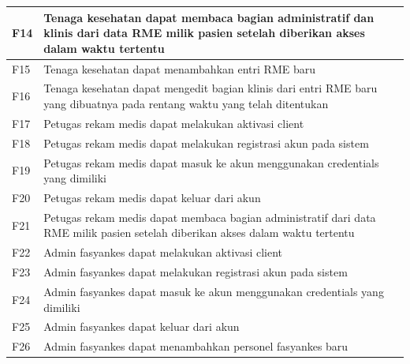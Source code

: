 \begin{longtable}{|p{0.8cm}|p{11.5cm}|}
	F14         & Tenaga kesehatan dapat membaca bagian administratif dan klinis dari data RME milik pasien setelah diberikan akses dalam waktu tertentu         \\ \hline
	F15         & Tenaga kesehatan dapat menambahkan entri RME baru                                                                                              \\ \hline
	F16         & Tenaga kesehatan dapat mengedit bagian klinis dari entri RME baru yang dibuatnya pada rentang waktu yang telah ditentukan                      \\ \hline
	F17         & Petugas rekam medis dapat melakukan aktivasi client                                                                                            \\ \hline
	F18         & Petugas rekam medis dapat melakukan registrasi akun pada sistem                                                                                \\ \hline
	F19         & Petugas rekam medis dapat masuk ke akun menggunakan credentials yang dimiliki                                                                  \\ \hline
	F20         & Petugas rekam medis dapat keluar dari akun                                                                                                     \\ \hline
	F21         & Petugas rekam medis dapat membaca bagian administratif dari data RME milik pasien setelah diberikan akses dalam waktu tertentu                 \\ \hline
	F22         & Admin fasyankes dapat melakukan aktivasi client                                                                                                \\ \hline
	F23         & Admin fasyankes dapat melakukan registrasi akun pada sistem                                                                                    \\ \hline
	F24         & Admin fasyankes dapat masuk ke akun menggunakan credentials yang dimiliki                                                                      \\ \hline
	F25         & Admin fasyankes dapat keluar dari akun                                                                                                         \\ \hline
	F26         & Admin fasyankes dapat menambahkan personel fasyankes baru                                                                                      \\ \hline

\end{longtable}
